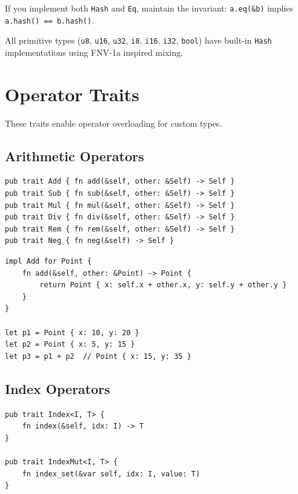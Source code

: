 \begin{warningbox}
If you implement both \texttt{Hash} and \texttt{Eq}, maintain the invariant: \texttt{a.eq(\&b)} implies \texttt{a.hash() == b.hash()}.
\end{warningbox}

All primitive types (\texttt{u8}, \texttt{u16}, \texttt{u32}, \texttt{i8}, \texttt{i16}, \texttt{i32}, \texttt{bool}) have built-in \texttt{Hash} implementations using FNV-1a inspired mixing.

\section{Operator Traits}
\label{sec:operator-traits}

These traits enable operator overloading for custom types.

\subsection{Arithmetic Operators}

\begin{lstlisting}
pub trait Add { fn add(&self, other: &Self) -> Self }
pub trait Sub { fn sub(&self, other: &Self) -> Self }
pub trait Mul { fn mul(&self, other: &Self) -> Self }
pub trait Div { fn div(&self, other: &Self) -> Self }
pub trait Rem { fn rem(&self, other: &Self) -> Self }
pub trait Neg { fn neg(&self) -> Self }
\end{lstlisting}

\begin{lstlisting}
impl Add for Point {
    fn add(&self, other: &Point) -> Point {
        return Point { x: self.x + other.x, y: self.y + other.y }
    }
}

let p1 = Point { x: 10, y: 20 }
let p2 = Point { x: 5, y: 15 }
let p3 = p1 + p2  // Point { x: 15, y: 35 }
\end{lstlisting}

\subsection{Index Operators}

\begin{lstlisting}
pub trait Index<I, T> {
    fn index(&self, idx: I) -> T
}

pub trait IndexMut<I, T> {
    fn index_set(&var self, idx: I, value: T)
}
\end{lstlisting}

